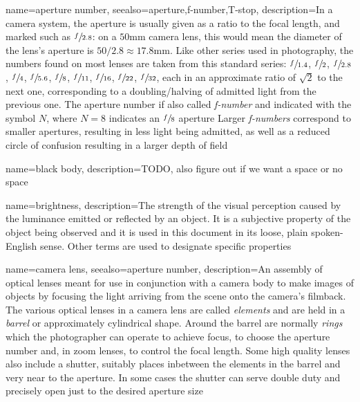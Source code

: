 {
	name={aperture number},
	seealso={aperture,f-number,T-stop},
	description={In a camera system, the aperture is usually given as a ratio to the
		focal length, and marked such as $\sfrac{f}{2.8}$: on a $50\unit{\milli\meter}$ 
		camera lens, this would mean the diameter of the lens's aperture 
		is $50 / 2.8 \approx 17.8\unit{\milli\meter}$. 
		Like other series used in photography, the
		numbers found on most lenses are taken from this standard series:
		$\sfrac{f}{1.4}$, $\sfrac{f}{2}$, $\sfrac{f}{2.8}$, $\sfrac{f}{4}$, $\sfrac{f}{5.6}$,
		$\sfrac{f}{8}$, $\sfrac{f}{11}$, $\sfrac{f}{16}$, $\sfrac{f}{22}$, $\sfrac{f}{32}$,
		each in an approximate ratio of $\sqrt{2}$ to the next one, corresponding to a doubling/halving of admitted light from the previous one. 
	    The aperture number if also called \textsl{f-number} and indicated with the symbol
    	$N$, where $N=8$ indicates an $\sfrac{f}{8}$ aperture
    	Larger \textsl{f-numbers} correspond to smaller apertures, resulting in less light 
    	being admitted, as well as a reduced \gls{circle of confusion} resulting in a larger depth of field
    	}
}

{
	name={black body},
	description={TODO, also figure out if we want a space or no space}
}

{
  name=brightness,
  description={The strength of the visual perception caused by the luminance emitted or
    reflected by an object. It is a subjective property of the object being
    observed and it is used in this document in its loose, 
    plain spoken-English sense. 
    Other terms are used to designate specific properties}
}

{
	name={camera lens},
	seealso={aperture number},
	description={An assembly of optical lenses meant for use in conjunction with a 
		camera body to make images of objects by focusing the light arriving from the scene
		onto the camera's filmback. 
		The various optical lenses in a camera lens are called \textsl{elements} and 
		are held in a \textsl{barrel} or approximately cylindrical shape.
		Around the barrel are normally \textsl{rings} which the photographer can
		operate to achieve focus, to choose the aperture number and, in zoom lenses, to
		control the focal length.
		Some high quality lenses also include a shutter, suitably places inbetween the
		elements in the barrel and very near to the aperture. In some cases the shutter 
		can serve double duty and precisely open just to the desired aperture size}
}

